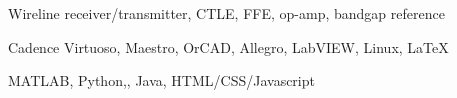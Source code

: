 \documentclass[11pt]{article}
\begin{document}

      {Wireline receiver/transmitter, CTLE, FFE, op-amp, bandgap reference}

      {Cadence Virtuoso, Maestro, OrCAD, Allegro, LabVIEW, Linux, \LaTeX}

      {MATLAB, Python,\CPP, Java, HTML/CSS/Javascript} 


\bigskip








\end{document}
